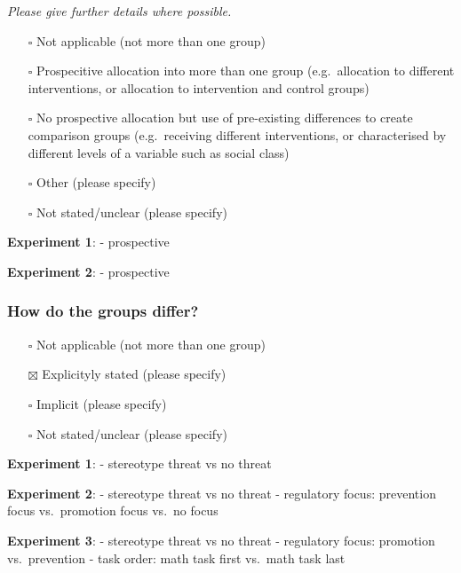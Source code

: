 \documentclass[
  doc, a4paper]{apa7}
\providecommand{\tightlist}{%
  \setlength{\itemsep}{0pt}\setlength{\parskip}{0pt}}
\begin{document}
\emph{Please give further details where possible.}

\begin{itemize}
\tightlist
\item[$\square$]
  Not applicable (not more than one group)\\
\item[$\square$]
  Prospecitive allocation into more than one group (e.g.~allocation to different interventions, or allocation to intervention and control groups)\\
\item[$\square$]
  No prospective allocation but use of pre-existing differences to create comparison groups (e.g.~receiving different interventions, or characterised by different levels of a variable such as social class)\\
\item[$\square$]
  Other (please specify)\\
\item[$\square$]
  Not stated/unclear (please specify)
\end{itemize}

\textbf{Experiment 1}:
- prospective

\textbf{Experiment 2}:
- prospective

\subsubsection{How do the groups differ?}\label{how-do-the-groups-differ}

\begin{itemize}
\tightlist
\item[$\square$]
  Not applicable (not more than one group)\\
\item[$\boxtimes$]
  Explicityly stated (please specify)\\
\item[$\square$]
  Implicit (please specify)\\
\item[$\square$]
  Not stated/unclear (please specify)
\end{itemize}

\textbf{Experiment 1}:
- stereotype threat vs no threat

\textbf{Experiment 2}:
- stereotype threat vs no threat
- regulatory focus: prevention focus vs.~promotion focus vs.~no focus

\textbf{Experiment 3}:
- stereotype threat vs no threat
- regulatory focus: promotion vs.~prevention
- task order: math task first vs.~math task last
\end{document}

